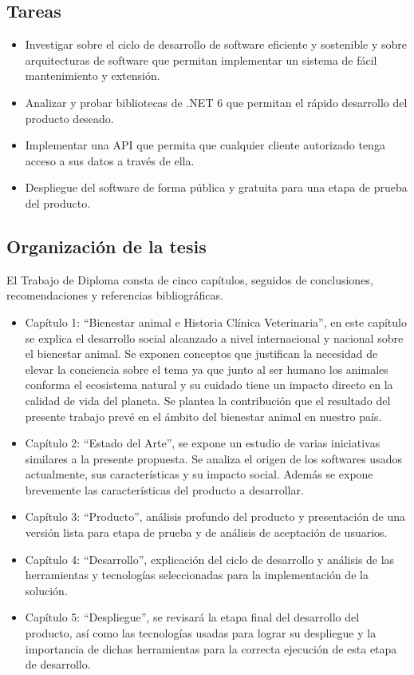 \subsection*{Tareas}

\begin{itemize}
\item Investigar sobre el ciclo de desarrollo de software eficiente y sostenible y sobre arquitecturas de software que permitan implementar un sistema de fácil mantenimiento y extensión.
\item Analizar y probar bibliotecas de .NET 6 que permitan el rápido desarrollo del producto deseado.
\item Implementar una API que permita que cualquier cliente autorizado tenga acceso a sus datos a través de ella.
\item Despliegue del software de forma pública y gratuita para una etapa de prueba del producto.
\end{itemize}

\subsection*{Organizaci\'on de la tesis}

El Trabajo de Diploma consta de cinco capítulos, seguidos de conclusiones, recomendaciones y referencias bibliográficas.
\begin{itemize}
\item Capítulo 1:  “Bienestar animal e Historia Clínica Veterinaria”, en este capítulo se explica el desarrollo social alcanzado a nivel internacional y nacional sobre el bienestar animal. Se exponen conceptos que justifican la necesidad de elevar la conciencia sobre el tema ya que junto al ser humano los animales conforma el ecosistema natural y su cuidado tiene un impacto directo en la calidad de vida del planeta. Se plantea la contribución que el resultado del presente trabajo prevé en el ámbito del bienestar animal en nuestro país. 

\item Capítulo 2: “Estado del Arte”, se expone un estudio de varias iniciativas similares a la presente propuesta. Se analiza el origen de los softwares usados actualmente, sus características y su impacto social. Además se expone brevemente las características del producto a desarrollar.

\item Capítulo 3: “Producto”, análisis profundo del producto y presentación de una versión lista para etapa de prueba y de análisis de aceptación de usuarios. 

\item Capítulo 4: “Desarrollo”, explicación del ciclo de desarrollo y análisis de las herramientas y tecnologías seleccionadas para la implementación de la solución.

\item Capítulo 5: “Despliegue”, se revisará la etapa final del desarrollo del producto, así como las tecnologías usadas para lograr su despliegue y la importancia de dichas herramientas para la correcta ejecución de esta etapa de desarrollo.

\end{itemize}
